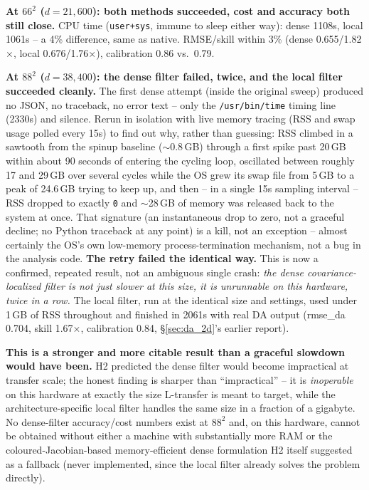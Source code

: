 \documentclass[11pt]{article}
\begin{document}
\textbf{At $66^2$ ($d{=}21{,}600$): both methods succeeded, cost and
accuracy both still close.} CPU time (\texttt{user+sys}, immune to
sleep either way): dense 1108s, local 1061s -- a 4\% difference, same
as native. RMSE/skill within 3\% (dense 0.655/1.82$\times$, local
0.676/1.76$\times$), calibration 0.86 vs.\ 0.79.

\textbf{At $88^2$ ($d{=}38{,}400$): the dense filter failed, twice, and
the local filter succeeded cleanly.} The first dense attempt (inside
the original sweep) produced no JSON, no traceback, no error text --
only the \texttt{/usr/bin/time} timing line (2330s) and silence. Rerun
in isolation with live memory tracing (RSS and swap usage polled every
15s) to find out why, rather than guessing: RSS climbed in a sawtooth
from the spinup baseline ($\sim$0.8\,GB) through a first spike past
20\,GB within about 90 seconds of entering the cycling loop, oscillated
between roughly 17 and 29\,GB over several cycles while the OS grew its
swap file from 5\,GB to a peak of 24.6\,GB trying to keep up, and then
-- in a single 15s sampling interval -- RSS dropped to exactly \texttt{0}
and $\sim$28\,GB of memory was released back to the system at once.
That signature (an instantaneous drop to zero, not a graceful decline;
no Python traceback at any point) is a kill, not an exception -- almost
certainly the OS's own low-memory process-termination mechanism, not a
bug in the analysis code. \textbf{The retry failed the identical way.}
This is now a confirmed, repeated result, not an ambiguous single crash:
\emph{the dense covariance-localized filter is not just slower at this
size, it is unrunnable on this hardware, twice in a row.} The local
filter, run at the identical size and settings, used under 1\,GB of RSS
throughout and finished in 2061s with real DA output (rmse\_da 0.704,
skill 1.67$\times$, calibration 0.84, \S\ref{sec:da_2d}'s earlier
report).

\textbf{This is a stronger and more citable result than a graceful
slowdown would have been.} H2 predicted the dense filter would become
impractical at transfer scale; the honest finding is sharper than
``impractical'' -- it is \emph{inoperable} on this hardware at exactly
the size L-transfer is meant to target, while the architecture-specific
local filter handles the same size in a fraction of a gigabyte. No
dense-filter accuracy/cost numbers exist at $88^2$ and, on this
hardware, cannot be obtained without either a machine with substantially
more RAM or the coloured-Jacobian-based memory-efficient dense
formulation H2 itself suggested as a fallback (never implemented, since
the local filter already solves the problem directly).
\end{document}
